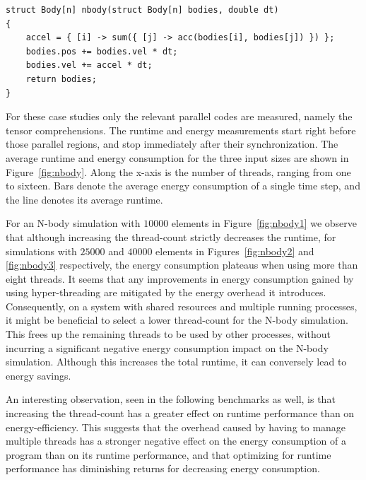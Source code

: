 \begin{verbatim}
struct Body[n] nbody(struct Body[n] bodies, double dt)
{
    accel = { [i] -> sum({ [j] -> acc(bodies[i], bodies[j]) }) };
    bodies.pos += bodies.vel * dt;
    bodies.vel += accel * dt;
    return bodies;
}
\end{verbatim}

For these case studies only the relevant parallel codes are measured, namely the tensor comprehensions.
The runtime and energy measurements start right before those parallel regions, and stop immediately after their synchronization.
The average runtime and energy consumption for the three input sizes are shown in Figure~\ref{fig:nbody}.
Along the x-axis is the number of threads, ranging from one to sixteen.
Bars denote the average energy consumption of a single time step, and the line denotes its average runtime.

For an N-body simulation with $10000$ elements in Figure~\ref{fig:nbody1} we observe that although increasing the thread-count strictly decreases the runtime, for simulations with $25000$ and $40000$ elements in Figures~\ref{fig:nbody2} and \ref{fig:nbody3} respectively, the energy consumption plateaus when using more than eight threads.
It seems that any improvements in energy consumption gained by using hyper-threading are mitigated by the energy overhead it introduces.
Consequently, on a system with shared resources and multiple running processes, it might be beneficial to select a lower thread-count for the N-body simulation.
This frees up the remaining threads to be used by other processes, without incurring a significant negative energy consumption impact on the N-body simulation.
Although this increases the total runtime, it can conversely lead to energy savings.

An interesting observation, seen in the following benchmarks as well, is that increasing the thread-count has a greater effect on runtime performance than on energy-efficiency.
This suggests that the overhead caused by having to manage multiple threads has a stronger negative effect on the energy consumption of a program than on its runtime performance, and that optimizing for runtime performance has diminishing returns for decreasing energy consumption.

